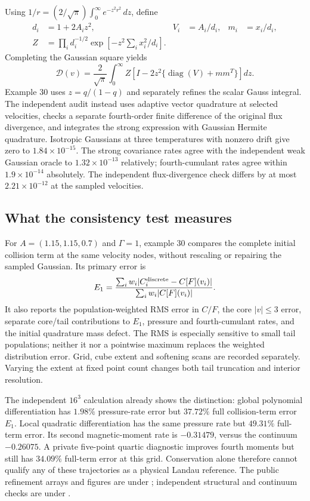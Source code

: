 \documentclass[11pt,letterpaper]{article}
\begin{document}
Using $1/r=(2/\sqrt\pi)\int_0^\infty e^{-z^2r^2}\,dz$,
define
\begin{align}
 d_i&=1+2A_i z^2,& V_i&=A_i/d_i,& m_i&=x_i/d_i,\\
 Z&=\prod_i d_i^{-1/2}\exp\left[-z^2\sum_i x_i^2/d_i\right].
\end{align}
Completing the Gaussian square yields
\begin{equation}
 \mathcal D(v)=\frac2{\sqrt\pi}\int_0^\infty
 Z\left[I-2z^2\{\operatorname{diag}(V)+mm^T\}\right]dz.
\end{equation}
Example 30 uses $z=q/(1-q)$ and separately refines the scalar Gauss
integral. The independent audit instead uses adaptive vector
quadrature at selected velocities, checks a separate fourth-order
finite difference of the original flux divergence, and integrates the
strong expression with Gaussian Hermite quadrature. Isotropic
Gaussians at three temperatures with nonzero drift give zero to
$1.84\times10^{-15}$. The strong covariance rates agree with the
independent weak Gaussian oracle to $1.32\times10^{-13}$ relatively;
fourth-cumulant rates agree within $1.9\times10^{-14}$ absolutely.
The independent flux-divergence check differs by at most
$2.21\times10^{-12}$ at the sampled velocities.

\subsection{What the consistency test measures}
For $A=(1.15,1.15,0.7)$ and $\Gamma=1$, example 30 compares the complete
initial collision term at the same velocity nodes, without rescaling
or repairing the sampled Gaussian. Its primary error is
\begin{equation}
 E_1=\frac{\sum_iw_i|C_i^{\rm discrete}-C[F](v_i)|}
 {\sum_iw_i|C[F](v_i)|}.
\end{equation}
It also reports the population-weighted RMS error in $C/F$, the
core $|v|\leq3$ error, separate core/tail contributions to $E_1$,
pressure and fourth-cumulant rates, and the initial quadrature mass
defect. The RMS is especially sensitive to small tail populations;
neither it nor a pointwise maximum replaces the weighted distribution
error. Grid, cube extent and softening scans are recorded separately.
Varying the extent at fixed point count changes both tail truncation
and interior resolution.

The independent $16^3$ calculation already shows the distinction:
global polynomial differentiation has $1.98\%$ pressure-rate error
but $37.72\%$ full collision-term error $E_1$. Local quadratic
 differentiation has the same pressure rate but $49.31\%$ full-term
error. Its second magnetic-moment rate is $-0.31479$, versus the
continuum $-0.26075$. A private five-point quartic diagnostic improves
fourth moments but still has $34.09\%$ full-term error at this grid.
Conservation alone therefore cannot qualify any of these trajectories
as a physical Landau reference. The public refinement arrays and
figures are under ; independent
structural and continuum checks are under
.
\end{document}
